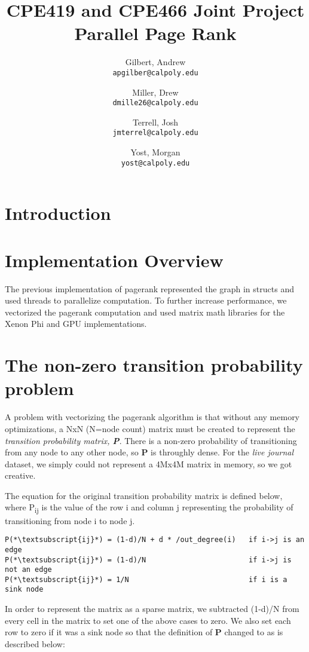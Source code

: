 \documentclass{report}
\title{CPE419 and CPE466 Joint Project\\Parallel Page Rank}
\author{
  Gilbert, Andrew\\
  \texttt{apgilber@calpoly.edu}
  \and
  Miller, Drew\\
  \texttt{dmille26@calpoly.edu}
  \and
  Terrell, Josh\\
  \texttt{jmterrel@calpoly.edu}
  \and
  Yost, Morgan\\
  \texttt{yost@calpoly.edu}
}
\date{}
\begin{document}
\maketitle

\begin{abstract}
\end{abstract}

\section{Introduction}

\section{Implementation Overview}
The previous implementation of pagerank represented the graph in structs and used threads to parallelize computation. To further increase performance, we vectorized the pagerank computation and used matrix math libraries for the Xenon Phi and GPU implementations.

\section{The non-zero transition probability problem}
A problem with vectorizing the pagerank algorithm is that without any memory optimizations, a NxN (N=node count) matrix must be created to represent the \textit{transition probability matrix, \textbf{P}}. There is a non-zero probability of transitioning from any node to any other node, so \textbf{P} is throughly dense. For the \textit{live journal} dataset, we simply could not represent a 4Mx4M matrix in memory, so we got creative.

The equation for the original transition probability matrix is defined below, where P\textsubscript{ij} is the value of the row i and column j representing the probability of transitioning from node i to node j.

\begin{lstlisting}
P(*\textsubscript{ij}*) = (1-d)/N + d * /out_degree(i)   if i->j is an edge
P(*\textsubscript{ij}*) = (1-d)/N                        if i->j is not an edge
P(*\textsubscript{ij}*) = 1/N                            if i is a sink node
\end{lstlisting}

In order to represent the matrix as a sparse matrix, we subtracted (1-d)/N from every cell in the matrix to set one of the above cases to zero. We also set each row to zero if it was a sink node so that the definition of \textbf{P} changed to as is described below:
\end{document}
